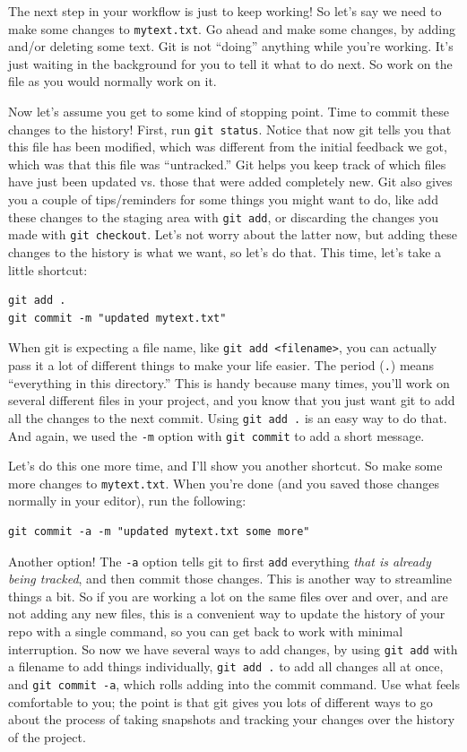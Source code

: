 \documentclass{article}
\begin{document}
The next step in your workflow is just to keep working!  So let's say we need to make some changes to \texttt{mytext.txt}.  Go ahead and make some changes, by adding and/or deleting some text. Git is not ``doing'' anything while you're working. It's just waiting in the background for you to tell it what to do next.  So work on the file as you would normally work on it.

Now let's assume you get to some kind of stopping point.  Time to commit these changes to the history!  First, run \texttt{git status}.  Notice that now git tells you that this file has been modified, which was different from the initial feedback we got, which was that this file was ``untracked.'' Git helps you keep track of which files have just been updated vs. those that were added completely new.  Git also gives you a couple of tips/reminders for some things you might want to do, like add these changes to the staging area with \texttt{git add}, or discarding the changes you made with \texttt{git checkout}.  Let's not worry about the latter now, but adding these changes to the history is what we want, so let's do that.  This time, let's take a little shortcut:


\begin{verbatim}
git add .
git commit -m "updated mytext.txt"
\end{verbatim}

When git is expecting a file name, like \texttt{git add <filename>}, you can actually pass it a lot of different things to make your life easier.  The period (\texttt{.}) means ``everything in this directory.''  This is handy because many times, you'll work on several different files in your project, and you know that you just want git to add all the changes to the next commit.  Using \texttt{git add .} is an easy way to do that.  And again, we used the \texttt{-m} option with \texttt{git commit} to add a short message.

Let's do this one more time, and I'll show you another shortcut. So make some more changes to \texttt{mytext.txt}.  When you're done (and you saved those changes normally in your editor), run the following:


\begin{verbatim}
git commit -a -m "updated mytext.txt some more"
\end{verbatim}

Another option! The \texttt{-a} option tells git to first \texttt{add} everything \emph{that is already being tracked}, and then commit those changes.  This is another way to streamline things a bit.  So if you are working a lot on the same files over and over, and are not adding any new files, this is a convenient way to update the history of your repo with a single command, so you can get back to work with minimal interruption.  So now we have several ways to add changes, by using \texttt{git add} with a filename to add things individually, \texttt{git add .} to add all changes all at once, and \texttt{git commit -a}, which rolls adding into the commit command.  Use what feels comfortable to you; the point is that git gives you lots of different ways to go about the process of taking snapshots and tracking your changes over the history of the project.
\end{document}

